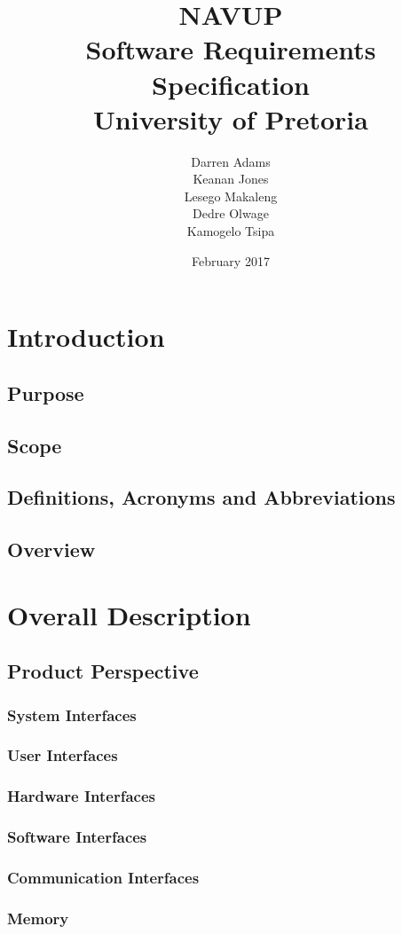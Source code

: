 \documentclass{article}
\title{NAVUP\\ Software Requirements Specification\\ University of Pretoria}
\author{Darren Adams\\ Keanan Jones\\ Lesego Makaleng\\ Dedre Olwage\\ Kamogelo Tsipa }
\date{February 2017}
\begin{document}
\maketitle
\pagebreak
\tableofcontents
\pagebreak
\section{Introduction}
    \subsection{Purpose}
    \subsection{Scope}
    \subsection{Definitions, Acronyms and Abbreviations}
    \subsection{Overview}
\section{Overall Description}
    \subsection{Product Perspective}
        \subsubsection{System Interfaces}
        \subsubsection{User Interfaces}
        \subsubsection{Hardware Interfaces}
        \subsubsection{Software Interfaces}
        \subsubsection{Communication Interfaces}
        \subsubsection{Memory}
\end{document}
